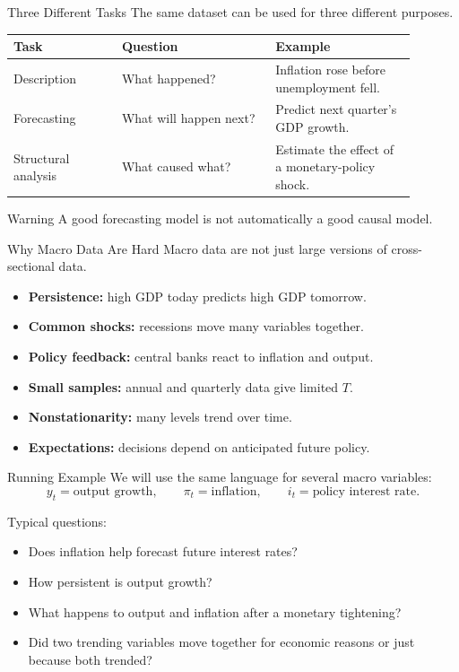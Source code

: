 \documentclass[11pt,aspectratio=169]{beamer}
\begin{document}
\begin{frame}{Three Different Tasks}
  The same dataset can be used for three different purposes.
  \vspace{0.4em}

  \begin{tabular}{p{0.24\linewidth}p{0.34\linewidth}p{0.31\linewidth}}
    \toprule
    Task & Question & Example \\
    \midrule
    Description & What happened? & Inflation rose before unemployment fell. \\
    Forecasting & What will happen next? & Predict next quarter's GDP growth. \\
    Structural analysis & What caused what? & Estimate the effect of a monetary-policy shock. \\
    \bottomrule
  \end{tabular}

  \begin{block}{Warning}
    A good forecasting model is not automatically a good causal model.
  \end{block}
\end{frame}

\begin{frame}{Why Macro Data Are Hard}
  Macro data are not just large versions of cross-sectional data.

  \begin{itemize}
    \item \textbf{Persistence:} high GDP today predicts high GDP tomorrow.
    \item \textbf{Common shocks:} recessions move many variables together.
    \item \textbf{Policy feedback:} central banks react to inflation and output.
    \item \textbf{Small samples:} annual and quarterly data give limited \(T\).
    \item \textbf{Nonstationarity:} many levels trend over time.
    \item \textbf{Expectations:} decisions depend on anticipated future policy.
  \end{itemize}
\end{frame}

\begin{frame}{Running Example}
  We will use the same language for several macro variables:
  \[
    y_t = \text{output growth},\qquad
    \pi_t = \text{inflation},\qquad
    i_t = \text{policy interest rate}.
  \]

  Typical questions:
  \begin{itemize}
    \item Does inflation help forecast future interest rates?
    \item How persistent is output growth?
    \item What happens to output and inflation after a monetary tightening?
    \item Did two trending variables move together for economic reasons or just because both trended?
  \end{itemize}
\end{frame}
\end{document}
